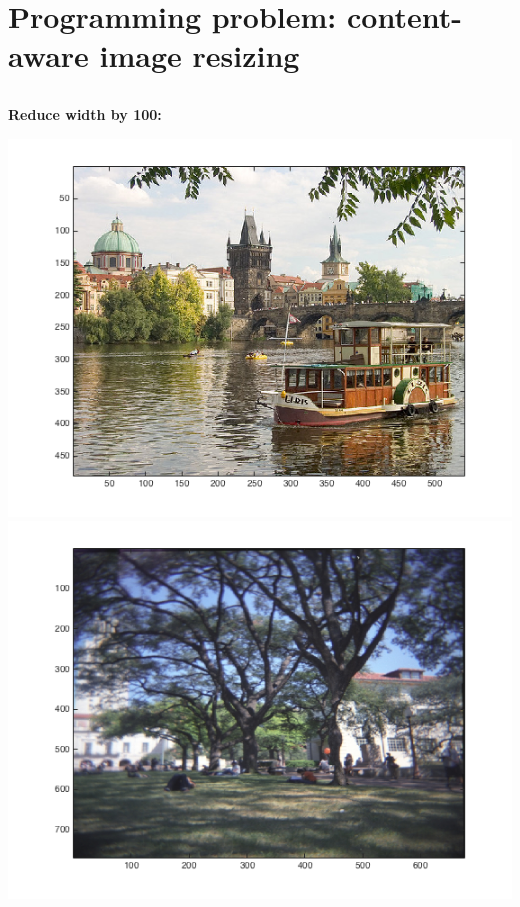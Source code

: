 \documentclass[11pt]{amsart}
\begin{document}
\begingroup
\Huge\section{Programming problem: content-aware image resizing}
\endgroup

\subsection{}
\textbf{Reduce width by 100:} \\
\begin{center}
\includegraphics[scale=0.40]{outputReduceWidthPrague.png}
\includegraphics[scale=0.40]{outputReduceWidthMall.png}
\end{center}
\end{document}
